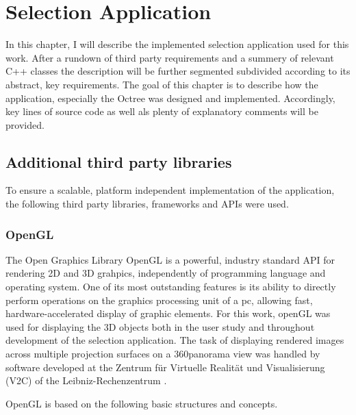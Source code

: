 \chapter{Selection Application}
\label{sec:selection_application}

In this chapter, I will describe the implemented selection application used for this work. After a rundown of third party requirements and a summery of relevant C++ classes the description will be further segmented subdivided according to its abstract, key requirements.
The goal of this chapter is to describe how the application, especially the Octree\cite{Octree} was designed and implemented. Accordingly, key lines of source code as well als plenty of explanatory comments will be provided.

\section{Additional third party libraries}
\label{sec:additional_third_party_libraries}

To ensure a scalable, platform independent implementation of the application, the following third party libraries, frameworks and APIs were used.

\subsection{OpenGL}
\label{sec:opengl}

The Open Graphics Library OpenGL \cite{OpenGL} is a powerful, industry standard API for rendering 2D and 3D grahpics, independently of programming language and operating system. One of its most outstanding features is its ability to directly perform operations on the graphics processing unit of a pc, allowing fast, hardware-accelerated display of graphic elements. For this work, openGL was used for displaying the 3D objects both in the user study and throughout development of the selection application. The task of displaying rendered images across multiple projection surfaces on a 360\degree panorama view was handled by software developed at the Zentrum f\"ur Virtuelle Realit\"at und Visualisierung (V2C) of the Leibniz-Rechenzentrum \cite{v2c}.

OpenGL is based on the following basic structures and concepts.

